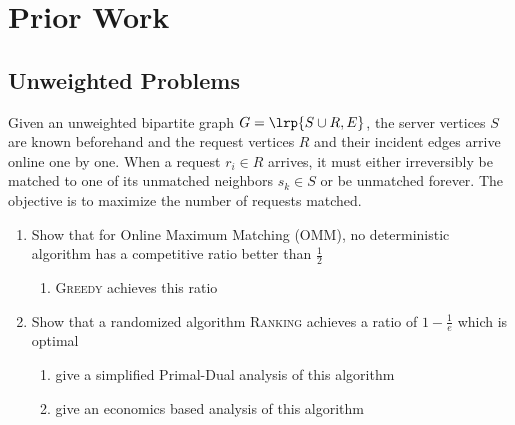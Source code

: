 \section{Prior Work}

\newcommand{\maxweightbmatch}{\textsf{Maximum Weight} $b$\textsf{-Matching}}
\newcommand{\momwmatch}{\textsf{Metric Online Maximum Weight Matching}}
\newcommand{\momwm}{\textsf{Metric OMWM}}
\newcommand{\momwbmatch}{\textsf{Metric Online Maximum Weight} $b$\textsf{-Matching}}
\newcommand{\momwbm}{\textsf{Metric OMW} $b$-\textsf{M}}
\newcommand{\ommatch}{\textsf{Online Maximum Matching}}
\newcommand{\omm}{\textsf{OMM}}
\newcommand{\ombmatch}{\textsf{Online Maximum} $b$\textsf{-Matching}}
\newcommand{\ombm}{\textsf{OM} $b$\textsf{-M}}
\newcommand{\omwmatch}{\textsf{Online Maximum Weight Matching}}
\newcommand{\omwm}{\textsf{OMWM}}
\newcommand{\omwbmatch}{\textsf{Online Maximum Weight} $b$-\textsf{Matching}}
\newcommand{\omwbm}{\textsf{OMW} $b$-\textsf{M}}

\subsection{Unweighted Problems}

\begin{problem}[\ommatch{}]
    Given an unweighted bipartite graph $G = \lrp{S \cup R, E}$, the server vertices
    $S$ are known beforehand and the request vertices $R$ and their incident edges 
    arrive online one by one. When a request $r_i \in R$ arrives, it must either irreversibly be matched to one of its 
    unmatched neighbors $s_k \in S$ or be unmatched forever. The objective is to maximize the number 
    of requests matched. 
\end{problem}

\begin{enumerate}
    \item Show that for \ommatch{} \textsf{(\omm{})}, no deterministic algorithm has a competitive ratio better than $\frac{1}{2}$
    \begin{enumerate}
        \item \textsc{Greedy} achieves this ratio
    \end{enumerate}
    \item Show that a randomized algorithm \textsc{Ranking} achieves a ratio of $1 - \frac{1}{e}$ which is optimal
    \begin{enumerate}
        \item \cite{devanur2013randomized} give a simplified Primal-Dual analysis of this algorithm 
        \item \cite{eden2021economics} give an economics based analysis of this algorithm
    \end{enumerate}
\end{enumerate}

